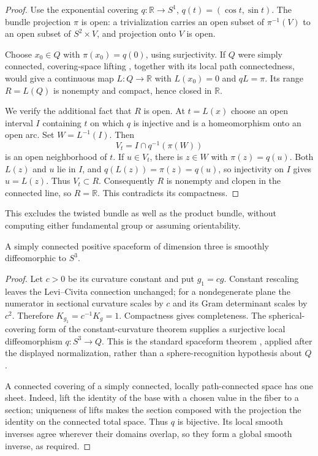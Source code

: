 \begin{proof}
Use the exponential covering $q:\mathbb R\to S^1$,
$q(t)=(\cos t,\sin t)$.  The bundle projection $\pi$ is open: a
trivialization carries an open subset of $\pi^{-1}(V)$ to an open subset
of $S^2\times V$, and projection onto $V$ is open.

Choose $x_0\in Q$ with $\pi(x_0)=q(0)$, using surjectivity.  If $Q$ were
simply connected, covering-space lifting
\cite[Proposition 1.33, pp.~61--62]{Hatcher}, together with its local path
connectedness, would give a continuous map $L:Q\to\mathbb R$ with
$L(x_0)=0$ and $qL=\pi$.  Its range $R=L(Q)$ is nonempty and compact,
hence closed in $\mathbb R$.

We verify the additional fact that $R$ is open.  At $t=L(x)$ choose an
open interval $I$ containing $t$ on which $q$ is injective and is a
homeomorphism onto an open arc.  Set $W=L^{-1}(I)$.  Then
\[
       V_t=I\cap q^{-1}(\pi(W))
\]
is an open neighborhood of $t$.  If $u\in V_t$, there is $z\in W$
with $\pi(z)=q(u)$.  Both $L(z)$ and $u$ lie in $I$, and
$q(L(z))=\pi(z)=q(u)$, so injectivity on $I$ gives $u=L(z)$.
Thus $V_t\subset R$.  Consequently $R$ is nonempty and clopen in the
connected line, so $R=\mathbb R$.  This contradicts its compactness.
\end{proof}

This excludes the twisted bundle as well as the product bundle, without
computing either fundamental group or assuming orientability.

\begin{proposition}
\label{prop:positive-spaceform-sphere}
A simply connected positive spaceform of dimension three is smoothly
diffeomorphic to $S^3$.
\end{proposition}

\begin{proof}
Let $c>0$ be its curvature constant and put $g_1=cg$.
Constant rescaling leaves the Levi--Civita connection unchanged; for a
nondegenerate plane the numerator in sectional curvature scales by $c$
and its Gram determinant scales by $c^2$.  Therefore
$K_{g_1}=c^{-1}K_g=1$.  Compactness gives completeness.
The spherical-covering form of the constant-curvature theorem supplies
a surjective local diffeomorphism $q:S^3\to Q$.
This is the standard spaceform theorem
\cite[Theorem 1.11(2) and the following spaceform paragraph, pp.~8--9]{MT2007}, applied after the displayed
normalization, rather than a sphere-recognition hypothesis about $Q$.

A connected covering of a simply connected, locally path-connected
space has one sheet.  Indeed, lift the identity of the base with a chosen
value in the fiber to a section; uniqueness of lifts
\cite[Proposition 1.34, p.~62]{Hatcher} makes the section
composed with the projection the identity on the connected total space.
Thus $q$ is bijective.  Its local smooth inverses agree wherever their
domains overlap, so they form a global smooth inverse, as required.
\end{proof}


